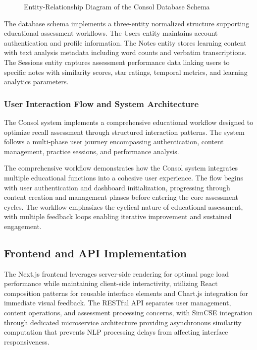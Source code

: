{\begin{figure}[H]
\begin{minipage}{\textwidth}
\end{minipage}
\caption{Entity-Relationship Diagram of the Consol Database Schema}
\label{fig:database-erd}
\end{figure}

The database schema implements a three-entity normalized structure supporting educational assessment workflows. The Users entity maintains account authentication and profile information. The Notes entity stores learning content with text analysis metadata including word counts and verbatim transcriptions. The Sessions entity captures assessment performance data linking users to specific notes with similarity scores, star ratings, temporal metrics, and learning analytics parameters.

\subsubsection{User Interaction Flow and System Architecture}

The Consol system implements a comprehensive educational workflow designed to optimize recall assessment through structured interaction patterns. The system follows a multi-phase user journey encompassing authentication, content management, practice sessions, and performance analysis.

The comprehensive workflow demonstrates how the Consol system integrates multiple educational functions into a cohesive user experience. The flow begins with user authentication and dashboard initialization, progressing through content creation and management phases before entering the core assessment cycles. The workflow emphasizes the cyclical nature of educational assessment, with multiple feedback loops enabling iterative improvement and sustained engagement.

\subsection{Frontend and API Implementation}

The Next.js frontend leverages server-side rendering for optimal page load performance while maintaining client-side interactivity, utilizing React composition patterns for reusable interface elements and Chart.js integration for immediate visual feedback. The RESTful API separates user management, content operations, and assessment processing concerns, with SimCSE integration through dedicated microservice architecture providing asynchronous similarity computation that prevents NLP processing delays from affecting interface responsiveness.

}
